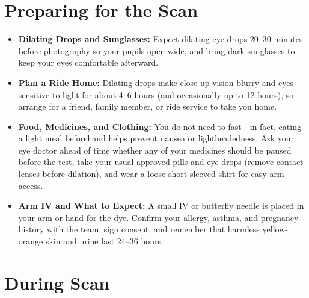 \section{Preparing for the Scan}

\begin{itemize}
    \item \textbf{Dilating Drops and Sunglasses:} Expect dilating eye drops 20--30 minutes before photography so your pupils open wide, and bring dark sunglasses to keep your eyes comfortable afterward.
    \item \textbf{Plan a Ride Home:} Dilating drops make close-up vision blurry and eyes sensitive to light for about 4--6 hours (and occasionally up to 12 hours), so arrange for a friend, family member, or ride service to take you home.
    \item \textbf{Food, Medicines, and Clothing:} You do not need to fast---in fact, eating a light meal beforehand helps prevent nausea or lightheadedness. Ask your eye doctor ahead of time whether any of your medicines should be paused before the test, take your usual approved pills and eye drops (remove contact lenses before dilation), and wear a loose short-sleeved shirt for easy arm access.
    \item \textbf{Arm IV and What to Expect:} A small IV or butterfly needle is placed in your arm or hand for the dye. Confirm your allergy, asthma, and pregnancy history with the team, sign consent, and remember that harmless yellow-orange skin and urine last 24--36 hours.
\end{itemize}

\section{During Scan}

